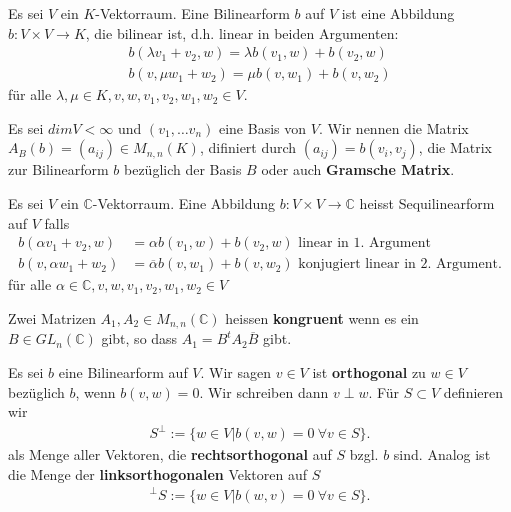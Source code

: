 \documentclass[../Algebra_script.tex]{subfiles}
\begin{document}
    \begin{definition}[Bilinearform]
        Es sei $V$ ein $K$-Vektorraum. Eine Bilinearform $b$ auf $V$ ist eine Abbildung $b:V \times V \to K$, die bilinear ist, d.h. linear in beiden
        Argumenten:
        \begin{align*}
            b(\lambda v_1 + v_2, w) = \lambda b(v_1,w) + b(v_2,w)\\
            b(v, \mu w_1 + w_2) = \mu b(v,w_1) + b(v, w_2)
        \end{align*}
        für alle $\lambda, \mu \in K, v, w, v_1, v_2, w_1, w_2 \in V$.
    \end{definition}

    \begin{definition}
        Es sei $dim V < \infty$ und $(v_1,\ldots v_{n})$ eine Basis von $V$. Wir nennen die Matrix $A_{B}(b) = (a_{ij}) \in M_{n,n}(K)$, difiniert durch
        $(a_{ij}) = b(v_{i},v_{j})$, die Matrix zur Bilinearform $b$ bezüglich der Basis $B$ oder auch \textbf{Gramsche Matrix}.
    \end{definition}

    \begin{definition}[Sequilinearform]
        Es sei $V$ ein $\mathbb{C}$-Vektorraum. Eine Abbildung $b:V\times V \to \mathbb{C}$ heisst Sequilinearform auf $V$ falls
        \begin{align*}
            b(\alpha v_1 + v_2, w) &= \alpha b(v_1, w) + b(v_2,w) \text{ linear in 1. Argument}\\
            b(v, \alpha w_1 + w_2) &= \overline{\alpha} b(v, w_1) + b(v, w_2) \text{ konjugiert linear in 2. Argument}
        .\end{align*}
        für alle $\alpha \in \mathbb{C}, v, w, v_1, v_2, w_1, w_2 \in V$
    \end{definition}

    \begin{definition}[kongruent]
        Zwei Matrizen $A_1, A_2 \in M_{n,n}(\mathbb{C})$ heissen \textbf{kongruent} wenn es ein $B \in GL_{n}(\mathbb{C})$ gibt, so dass $A_1 = B^{t}A_2
        \overline{B}$ gibt.
    \end{definition}

    \begin{definition}[Orthogonal]
        Es sei $b$ eine Bilinearform auf $V$. Wir sagen $v \in V$ ist \textbf{orthogonal} zu $w \in V$ bezüglich $b$, wenn $b(v, w) = 0$. Wir schreiben dann $v
        \perp w$. Für $S \subset V$ definieren wir
        \begin{align*}
            S^{\perp} := \{w \in V | b(v, w) = 0 \: \forall v \in S\}
        .\end{align*}
        als Menge aller Vektoren, die \textbf{rechtsorthogonal} auf $S$ bzgl. $b$ sind. Analog ist die Menge der \textbf{linksorthogonalen} Vektoren auf $S$ 
        \begin{align*}
            {}^{\perp}S := \{w \in V | b(w, v) = 0 \: \forall v \in S\}
        .\end{align*}
    \end{definition}
\end{document}
